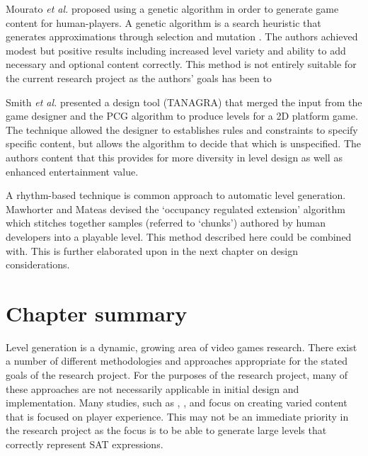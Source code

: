 \documentclass[11pt, a4paper, oneside]{report} %
\begin{document}

Mourato \textit{et al.} \cite{mourato2011automatic} proposed using a genetic algorithm in order to
generate game content for human-players. A genetic algorithm is a search heuristic that generates
approximations through selection and mutation \cite{srinivas1994genetic}. The authors achieved
modest but positive results including increased level variety and ability to add necessary and
optional content correctly. This method is not entirely suitable for the current research project as
the authors' goals has been to

Smith \textit{et al.} \@\cite{smith2011tanagra} presented a design tool (TANAGRA) that merged the
input from the game designer and the PCG algorithm to produce levels for a 2D platform game. The
technique allowed the designer to establishes rules and constraints to specify specific content, but
allows the algorithm to decide that which is unspecified. The authors content that this provides for
more diversity in level design as well as enhanced entertainment value.

A rhythm-based technique is common approach to automatic level generation.
Mawhorter and Mateas \cite{mawhorter2010procedural} devised the `occupancy regulated extension'
algorithm which stitches together samples (referred to `chunks') authored by human developers into a
playable level. This method described here could be combined with. This is further elaborated upon
in the next chapter on design considerations.

\section{Chapter summary}

Level generation is a dynamic, growing area of video games research. There exist a number of
different methodologies and approaches appropriate for the stated goals of the research project. For
the purposes of the research project, many of these approaches are not necessarily applicable in
initial design and implementation. Many studies, such as \cite{sorenson2011generic}, \cite{5035629},
and \cite{smith2011tanagra} focus on creating varied content that is focused on player experience.
This may not be an immediate priority in the research project as the focus is to be able to generate
large levels that correctly represent SAT expressions.
\end{document}
